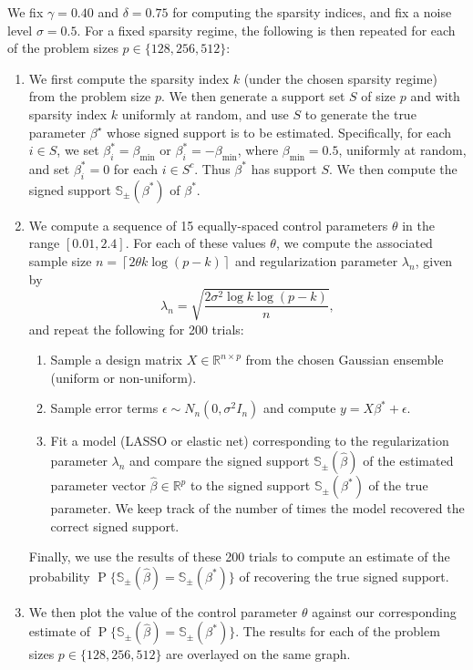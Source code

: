 \documentclass[letterpaper,12pt]{article}
\DeclareMathOperator{\prob}{P}
\newcommand{\ceil}[1]{\left\lceil#1\right\rceil}
\begin{document}
We fix $\gamma = 0.40$ and $\delta = 0.75$ for computing the sparsity
indices, and fix a noise level $\sigma = 0.5$. For a fixed sparsity
regime, the following is then repeated for each of the problem sizes
$p \in \{128, 256, 512\}$:

\begin{enumerate}
\item We first compute the sparsity index $k$ (under the chosen
  sparsity regime) from the problem size $p$. We then generate a
  support set $S$ of size $p$ and with sparsity index $k$ uniformly at
  random, and use $S$ to generate the true parameter $\beta^\star$
  whose signed support is to be estimated. Specifically, for each
  $i \in S$, we set $\beta^\ast_i = \beta_{\mathrm{min}}$ or
  $\beta^\ast_i = -\beta_{\mathrm{min}}$, where
  $\beta_{\mathrm{min}} = 0.5$, uniformly at random, and set
  $\beta^\ast_i = 0$ for each $i \in S^c$. Thus $\beta^\ast$ has
  support $S$. We then compute the signed support
  $\mathbb{S}_\pm(\beta^\ast)$ of $\beta^\ast$.

\item We compute a sequence of 15 equally-spaced control parameters
  $\theta$ in the range $[0.01, 2.4]$. For each of these values
  $\theta$, we compute the associated sample size
  $n = \ceil{2 \theta k \log(p - k)}$ and regularization parameter
  $\lambda_n$, given by
    \begin{equation*}
      \lambda_n = \sqrt{\frac{2\sigma^2 \log k \log(p - k)}{n}},
    \end{equation*}
    and repeat the following for 200 trials:
  \begin{enumerate}
  \item Sample a design matrix $X \in \mathbb{R}^{n \times p}$ from
    the chosen Gaussian ensemble (uniform or non-uniform).
  \item Sample error terms $\epsilon \sim N_n(0, \sigma^2 I_n)$ and
    compute $y = X\beta^\ast + \epsilon$.
  \item Fit a model (LASSO or elastic net) corresponding to the
    regularization parameter $\lambda_n$ and compare the signed
    support $\mathbb{S}_\pm(\hat{\beta})$ of the estimated parameter
    vector $\hat{\beta} \in \mathbb{R}^p$ to the signed support
    $\mathbb{S}_\pm(\beta^\ast)$ of the true parameter. We keep track
    of the number of times the model recovered the correct signed
    support.
  \end{enumerate}
  Finally, we use the results of these 200 trials to compute an
  estimate of the probability
  $\prob\{\mathbb{S}_\pm(\hat{\beta}) = \mathbb{S}_\pm(\beta^\ast)\}$
  of recovering the true signed support.

\item We then plot the value of the control parameter $\theta$ against
  our corresponding estimate of
  $\prob\{\mathbb{S}_\pm(\hat{\beta}) =
  \mathbb{S}_\pm(\beta^\ast)\}$. The results for each of the problem
  sizes $p \in \{128, 256, 512\}$ are overlayed on the same graph.
\end{enumerate}
\end{document}
